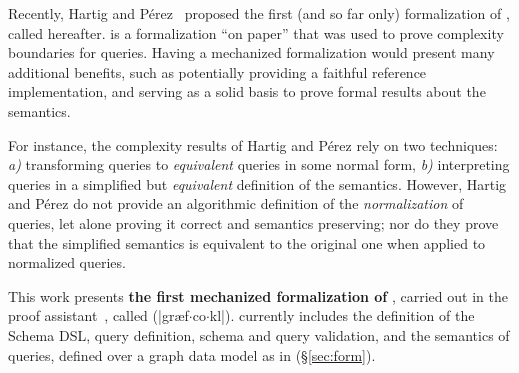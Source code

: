 Recently, Hartig and Pérez~\cite{gqlph} proposed the first (and so far only) formalization of \gql, called \HP hereafter. 
\HP is a formalization ``on paper'' that was used to prove complexity boundaries for \gql queries. Having a mechanized formalization would present many additional benefits, such as potentially providing a faithful reference implementation, and serving as a solid basis to prove formal results about the \gql semantics. 

For instance, the complexity results of Hartig and Pérez rely on two techniques: {\em a)} transforming queries to {\em equivalent} queries in some  normal form, {\em b)} interpreting queries in a simplified but {\em equivalent} definition of the semantics. However, Hartig and Pérez do not provide an algorithmic definition of the {\em normalization} of queries, let alone proving it correct and semantics preserving;
nor do they prove that the simplified semantics is equivalent to the original one when applied to normalized queries.



This work presents {\bf the first mechanized formalization of \gql}, carried out in the \coq proof assistant~\cite{Coq}, called \gcoql (|græf$\cdot$co$\cdot$k{\pmschwa}l|). 
\gcoql currently includes the definition of the Schema DSL, query definition, schema and query validation, and the semantics of queries, defined over a graph data model as in \HP (\S\ref{sec:form}).

